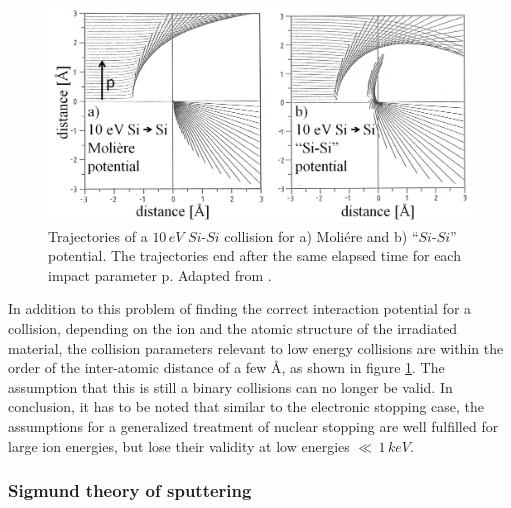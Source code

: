 \begin{figure}
	\centering
		\includegraphics[width=.75\textwidth]{images/SiSicollision.png}
	\caption{Trajectories of a $10\,eV$ $Si$-$Si$ collision for a) Moliére and b) ``$Si$-$Si$'' potential. The trajectories end after the same elapsed time for each impact parameter p. Adapted from \cite{eckstein_computer_1991}.}
	\label{SiSi}
\end{figure} 

In addition to this problem of finding the correct interaction potential for a collision, depending on the ion and the atomic structure of the irradiated material, the collision parameters relevant to low energy collisions are within the order of the inter-atomic distance of a few \AA, as shown in figure \ref{SiSi}. The assumption that this is still a binary collisions can no longer be valid. In conclusion, it has to be noted that similar to the electronic stopping case, the assumptions for a generalized treatment of nuclear stopping are well fulfilled for large ion energies, but lose their validity at low energies $\ll\,1\,keV$.

\subsubsection{Sigmund theory of sputtering}

